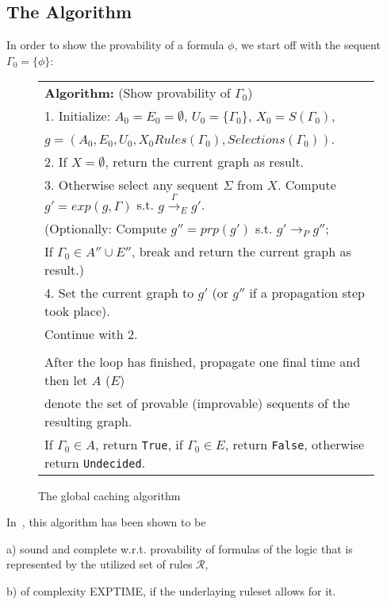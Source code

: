 \documentclass{llncs}
\begin{document}
\subsection{The Algorithm}

In order to show the provability of a formula $\phi$, we start off with the sequent
$\Gamma_0=\{\phi\}$:

\begin{footnotesize}
\begin{figure}[!h]
  \begin{center}
\begin{tabular}{| l |}
\hline
\textbf{Algorithm:} (Show provability of $\Gamma_0$)\\
1. Initialize: $A_0=E_0=\emptyset$, $U_0=\{\Gamma_0\}$, $X_0=S(\Gamma_0)$,\\ \quad$g=(A_0, E_0, U_0, X_0
Rules(\Gamma_0), Selections(\Gamma_0))$.\\
2. If $X=\emptyset$, return the current graph as result.\\
3. Otherwise select any sequent $\Sigma$ from $X$. Compute $g'=exp(g,\Gamma)$ s.t.
$g\stackrel{\Gamma}\rightarrow_E g'$.\\ \quad (Optionally: Compute $g''=prp(g')$ s.t.
$g'\rightarrow_P g''$;\\ \quad If $\Gamma_0\in A''\cup E''$, break and return the current
graph as result.)\\
4. Set the current graph to $g'$ (or $g''$ if a propagation step took place). \\\quad Continue with 2.\\\\
After the loop has finished, propagate one final time and then
let $A$ ($E$) \\ denote the set of provable (improvable) sequents of the resulting
graph. \\ If $\Gamma_0\in A$, return \verb|True|, if $\Gamma_0\in E$, return
\verb|False|, otherwise return \verb|Undecided|.\\
\hline
 \end{tabular}
  \end{center}
  \caption{The global caching algorithm}
  \label{fig:globalAlg}
\end{figure}
\end{footnotesize}

In~\cite{GoreEA10}, this algorithm has been shown to be
\begin{description}
\item{a) }sound and complete w.r.t. provability of formulas of the logic that is
represented by the utilized set of rules $\mathcal{R}$,
\item{b) }of complexity EXPTIME, if the underlaying ruleset allows for it.
\end{description}
\end{document}
